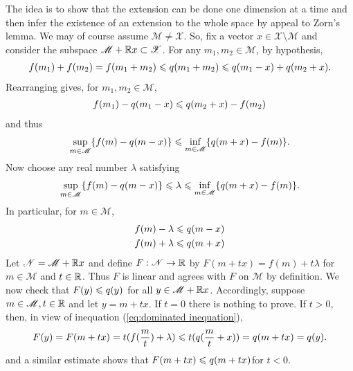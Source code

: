 \begin{proofsolution}
    The idea is to show that the extension can be done one dimension at a time and
    then infer the existence of an extension to the whole space by appeal to Zorn's lemma.
    We may of course assume $\mathscr{M}\neq \mathscr{X}$. 
    So, fix a vector $x\in\mathscr{X}\setminus \mathscr{M}$
    and consider the subspace $\mathscr{M}+\mathbb{R} x\subset \mathscr{X}$.
    For any $m_1,m_2\in\mathscr{M}$, by hypothesis,
    \begin{align*}
        f(m_1) + f(m_2)=f(m_1+m_2)\leqslant q(m_1+m_2)\leqslant q(m_1-x)+q(m_2+x).
    \end{align*}
    Rearranging gives, for $m_1,m_2\in\mathscr{M}$,
    \begin{align*}
        f(m_1)-q(m_1-x)\leqslant q(m_2+x)-f(m_2)
    \end{align*}
    and thus
    \begin{align*}
        \sup_{m\in\mathscr{M}} \{f(m)-q(m-x)\}\leqslant \inf_{m\in\mathscr{M}} \{q(m+x)-f(m)\}.
    \end{align*}
    Now choose any real number $\lambda$ satisfying
    \begin{align*}
        \sup_{m\in\mathscr{M}} \{f(m)-q(m-x)\}\leqslant \lambda \leqslant \inf_{m\in\mathscr{M}} \{q(m+x)-f(m)\}.
    \end{align*}
    In particular, for $m\in\mathscr{M}$,
    \begin{align}
        \begin{aligned}
        f(m)-\lambda \leqslant q(m-x)\\
        f(m)+\lambda \leqslant q(m+x)
        \end{aligned}
        \label{eq:dominated inequation}
    \end{align}
    Let $\mathscr{N}=\mathscr{M}+\mathbb{R} x$ and define $F:\mathscr{N}\rightarrow \mathbb{R}$ by $F(m+tx)=f(m)+t\lambda$ for $m\in\mathscr{M}$
    and $t\in\mathbb{R}$. Thus $F$ is linear and agrees with $F$ on $\mathscr{M}$ by definition.
    We now check that $F(y)\leqslant q(y)$ for all $y\in\mathscr{M}+\mathbb{R} x$.
    Accordingly, suppose $m\in\mathscr{M},t\in\mathbb{R}$ and let $y=m+tx$.
    If $t=0$ there is nothing to prove. If $t>0$, then, in view of inequation (\ref{eq:dominated inequation}),
    \begin{align}
        F(y) = F(m+tx) = t(f(\frac{m}{t})+\lambda)\leqslant t(q(\frac{m}{t}+x))=q(m+tx)=q(y).
    \end{align}
    and a similar estimate shows that $F(m+tx)\leqslant q(m+tx)$for $t < 0$.
    \par

\end{proofsolution}
